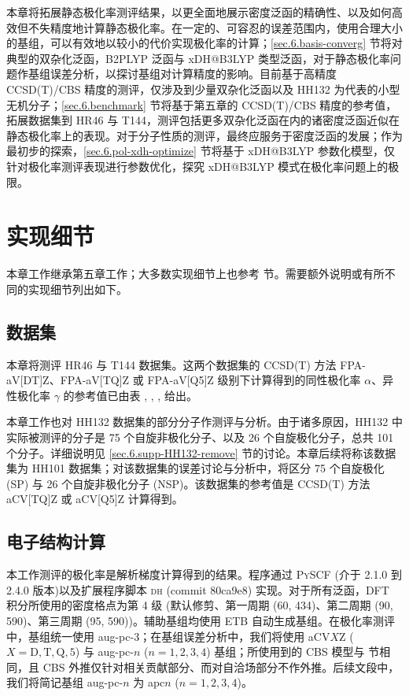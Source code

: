 本章将拓展静态极化率测评结果，以更全面地展示密度泛函的精确性、以及如何高效但不失精度地计算静态极化率。在一定的、可容忍的误差范围内，使用合理大小的基组，可以有效地以较小的代价实现极化率的计算；\ref{sec.6.basis-converg} 节将对典型的双杂化泛函，B2PLYP 泛函与 xDH@B3LYP 类型泛函，对于静态极化率问题作基组误差分析，以探讨基组对计算精度的影响。目前基于高精度 CCSD(T)/CBS 精度的测评，仅涉及到少量双杂化泛函以及 HH132\cite{Hait-Head-Gordon.PCCP.2018} 为代表的小型无机分子；\ref{sec.6.benchmark} 节将基于第五章的 CCSD(T)/CBS 精度的参考值，拓展数据集到 HR46\cite{Hickey-Rowley.JPCA.2014} 与 T144\cite{Wu-Thakkar.CPL.2015}，测评包括更多双杂化泛函在内的诸密度泛函近似在静态极化率上的表现。对于分子性质的测评，最终应服务于密度泛函的发展；作为最初步的探索，\ref{sec.6.pol-xdh-optimize} 节将基于 xDH@B3LYP 参数化模型\cite{Zhang-Xu.JPCL.2021}，仅针对极化率测评表现进行参数优化，探究 xDH@B3LYP 模式在极化率问题上的极限。

\section{实现细节}

本章工作继承第五章工作；大多数实现细节上也参考  节。需要额外说明或有所不同的实现细节列出如下。

\subsection{数据集}

本章将测评 HR46\cite{Hickey-Rowley.JPCA.2014} 与 T144\cite{Wu-Thakkar.CPL.2015} 数据集。这两个数据集的 CCSD(T) 方法 FPA-aV[DT]Z、FPA-aV[TQ]Z 或 FPA-aV[Q5]Z 级别下计算得到的同性极化率 $\alpha$、异性极化率 $\gamma$ 的参考值已由表 , , ,  给出。

本章工作也对 HH132 数据集\cite{Hait-Head-Gordon.PCCP.2018}的部分分子作测评与分析。由于诸多原因，HH132 中实际被测评的分子是 75 个自旋非极化分子、以及 26 个自旋极化分子，总共 101 个分子。详细说明见 \ref{sec.6.supp-HH132-remove} 节的讨论。本章后续将称该数据集为 HH101 数据集；对该数据集的误差讨论与分析中，将区分 75 个自旋极化 (SP) 与 26 个自旋非极化分子 (NSP)。该数据集的参考值是 CCSD(T) 方法 aCV[TQ]Z 或 aCV[Q5]Z 计算得到。

\subsection{电子结构计算}

本工作测评的极化率是解析梯度计算得到的结果。程序通过 \textsc{PySCF} (介于 2.1.0 到 2.4.0 版本)\cite{Sun-Chan.WCMS.2018, Sun-Chan.JCP.2020}以及扩展程序脚本 \textsc{dh} (commit 80ca9e8)\cite{dh.ajz34} 实现。对于所有泛函，DFT 积分所使用的密度格点为第 4 级 (默认修剪、第一周期 (60, 434)、第二周期 (90, 590)、第三周期 (95, 590))。辅助基组均使用 ETB 自动生成基组\cite{Stoychev-Neese.JCTC.2017}。在极化率测评中，基组统一使用 aug-pc-3；在基组误差分析中，我们将使用 aCV$X$Z ($X = \mathrm{D, T, Q, 5}$) 与 aug-pc-$n$ ($n = 1, 2, 3, 4$) 基组；所使用到的 CBS 模型与  节相同，且 CBS 外推仅针对相关贡献部分、而对自洽场部分不作外推。后续文段中，我们将简记基组 aug-pc-$n$ 为 apc$n$ ($n = 1, 2, 3, 4$)。


